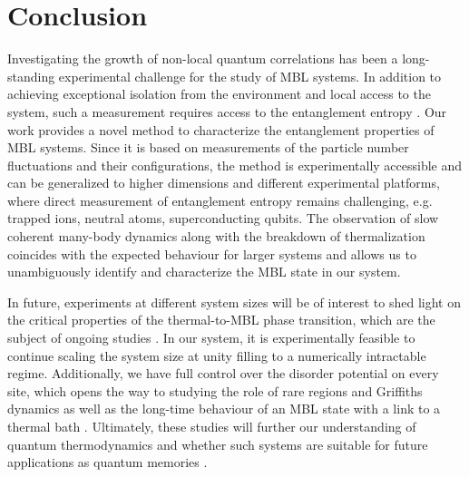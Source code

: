 \section{Conclusion}

Investigating the growth of non-local quantum correlations has been a long-standing experimental challenge for the study of MBL systems. In addition to achieving exceptional isolation from the environment and local access to the system, such a measurement requires access to the entanglement entropy \cite{Islam2015}. Our work provides a novel method to characterize the entanglement properties of MBL systems. Since it is based on measurements of the particle number fluctuations and their configurations, the method is experimentally accessible and can be generalized to higher dimensions and different experimental platforms, where direct measurement of entanglement entropy remains challenging, e.g. trapped ions, neutral atoms, superconducting qubits. The observation of slow coherent many-body dynamics along with the breakdown of thermalization coincides with the expected behaviour for larger systems and allows us to unambiguously identify and characterize the MBL state in our system.

In future, experiments at different system sizes will be of interest to shed light on the critical properties of the thermal-to-MBL phase transition, which are the subject of ongoing studies \cite{Vosk2015, Potter2015, Khemani2017, Lueschen2017a}. In our system, it is experimentally feasible to continue scaling the system size at unity filling to a numerically intractable regime. Additionally, we have full control over the disorder potential on every site, which opens the way to studying the role of rare regions and Griffiths dynamics as well as the long-time behaviour of an MBL state with a link to a thermal bath \cite{Agarwal2017, Roeck2017, Nandkishore2017}. Ultimately, these studies will further our understanding of quantum thermodynamics and whether such systems are suitable for future applications as quantum memories \cite{Nandkishore2015, Banuls2017}.

